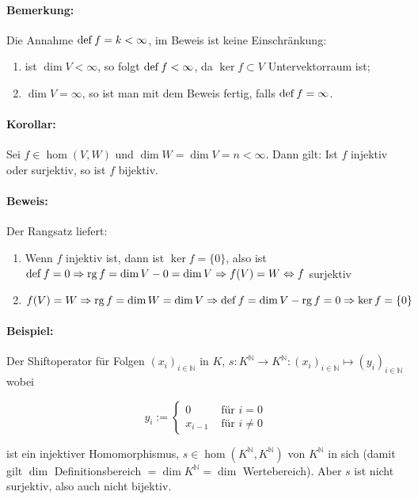 \paragraph{Bemerkung: }
	Die Annahme $\operatorname{def} f = k<\infty$, im Beweis ist keine Einschränkung:
	\begin{enumerate}
		\item ist $\dim V < \infty$, so folgt $\operatorname{def} f<\infty$, da $\ker f\subset V$ Untervektorraum ist;			
		\item $\dim V = \infty$, so ist man mit dem Beweis fertig, falls $\operatorname{def} f = \infty$.
	\end{enumerate}
			
\paragraph{Korollar: } 
	Sei $f\in \hom(V,W)$ und $\dim W = \dim V = n<\infty$.
	Dann gilt: Ist $f$ injektiv oder surjektiv, so ist $f$ bijektiv.
	
\paragraph{Beweis: } 
	Der Rangsatz liefert:
	\begin{enumerate}
		\item Wenn $ f $ injektiv ist, dann ist $\ker f = \{{0\}}$, also ist $ \operatorname{def} f = 0 \Rightarrow \operatorname{rg} f = \dim V-0 = \dim V \Rightarrow f(V) = W \Leftrightarrow f$ surjektiv
		\item $f(V) = W \Rightarrow \operatorname{rg} f = \dim W = \dim V \Rightarrow \operatorname{def} f= \dim V - \operatorname{rg} f=0 \Rightarrow \ker f = \{{0}\}$
	\end{enumerate}
	
\paragraph{Beispiel: }
	Der Shiftoperator für Folgen $(x_i)_{i\in \mathbb{N}}$ in $K$, $s: K^{\mathbb{N}} \to K^{\mathbb{N}}: (x_i)_{i\in \mathbb{N}} \mapsto (y_i)_{i\in \mathbb{N}}$ wobei
	
	\begin{equation*}
		y_i :=
		\begin{cases}
			0 &\text{ für } i = 0\\
			x_{i-1} &\text{ für } i \neq 0
		\end{cases}
	\end{equation*}
			
	ist ein injektiver Homomorphismus, $s\in \hom(K^\mathbb{N},K^\mathbb{N})$ von $K^\mathbb{N}$ in sich (damit gilt $\dim $ Definitionsbereich $= \dim K^\mathbb{N}= \dim$ Wertebereich). Aber $s$ ist nicht surjektiv, also auch nicht bijektiv.
	
